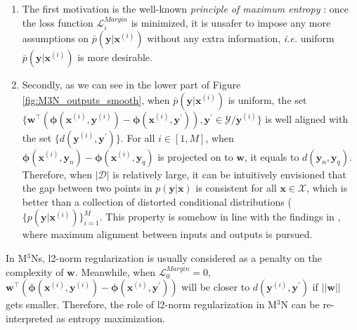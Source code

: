 \begin{enumerate}
        \item The first motivation is   
            the well-known \emph{principle of maximum entropy} \citep{max_entropy_NLP}: once the loss function $\mathcal{L}_i^{Margin}$ is minimized, it is unsafer to impose any more assumptions on $\bar p(\mathbf{y}|\mathbf{x}^{(i)})$ without 
any extra information, \emph{i.e.} uniform $\bar p(\mathbf{y}|\mathbf{x}^{(i)})$  is more desirable.
        \item Secondly, as we can see in the lower part of Figure 
\ref{fig:M3N_outputs_smooth}, when $\bar p(\mathbf{y}|\mathbf{x}^{(i)})$ is uniform, the set 
$\{\mathbf{w}^{\top}(\boldsymbol{\phi}(\mathbf{x}^{(i)},\mathbf{y}^{(i)})-\boldsymbol{\phi}(\mathbf{x}^{(i)},\mathbf{y}^\prime)),\mathbf{y}^\prime\in \mathcal{Y}/\mathbf{y}^{(i)}\}$ is well 
aligned with the set  $\{d(\mathbf{y}^{(i)},\mathbf{y}^\prime)\}$. For all 
$i\in[1,M]$, when $\boldsymbol{\phi}(\mathbf{x}^{(i)},\mathbf{y}_n)-\boldsymbol{\phi}(\mathbf{x}^{(i)},\mathbf{y}_q)$ is projected on to $\mathbf{w}$, it equals 
to $d(\mathbf{y}_n,\mathbf{y}_q)$. Therefore, when $|\mathcal{D}|$ is relatively large, it can be intuitively envisioned that the gap between two points in $p(\mathbf{\mathbf{y}|\mathbf{x}})$ is 
consistent for all $\mathbf{x}\in\mathcal{X}$, which is better than a collection of distorted conditional distributions ($\{p(\mathbf{y}|\mathbf{x}^{(i)})\}_{i=1}^M$. This property is somehow 
in line with the findings in \cite{input-output_alignment}, where maximum alignment between inputs and outputs is pursued.      
\end{enumerate}
In M$^3$Ns, l2-norm regularization is usually considered as a penalty on the complexity of $\mathbf{w}$. Meanwhile, when $\mathcal{L}_0^{Margin}=0$,  
$\mathbf{w}^{\top}(\boldsymbol{\phi}(\mathbf{x}^{(i)},\mathbf{y}^{(i)})-\boldsymbol{\phi}(\mathbf{x}^{(i)},\mathbf{y}^\prime))$ will be closer to $d(\mathbf{y}^{(i)},\mathbf{y}^\prime)$ 
if $||\mathbf{w}||$ gets smaller. Therefore, the role of l2-norm regularization in M$^3$N can be re-interpreted as entropy maximization.       
